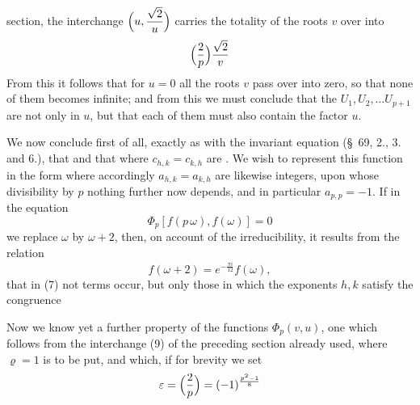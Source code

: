 section, the interchange $\Bigl(u,\dfrac{\sqrt2}{u}\Bigr)$ carries the
totality of the roots $v$ over into
\[
\Bigl(\frac{2}{p}\Bigr)\frac{\sqrt2}{v}
\]
From this it follows that for $u=0$ all the roots $v$ pass over into
zero, so that none of them becomes infinite; and from this we must
conclude that the $U_1, U_2, \ldots U_{p+1}$ are not only
 in $u$, but that each of them must also
contain the factor $u$.

We now conclude first of all, exactly as with the invariant equation
(\S\ 69, 2., 3. and 6.), that
and that
where $c_{h,k}=c_{k,h}$ are .
We wish to represent this function in the form
where accordingly $a_{h,k}=a_{k,h}$ are likewise integers, upon whose
divisibility by $p$ nothing further now depends, and in particular
$a_{p,p}=-1$. If in the equation
\[
\Phi_p[f(p\,\omega), f(\omega)]=0
\]
we replace $\omega$ by $\omega+2$, then, on account of the
irreducibility, it results from the relation
\[
f(\omega+2)=e^{-\frac{\pi i}{12}}f(\omega),
\]
that in (7) not  terms occur, but only those in which the exponents
$h, k$ satisfy the congruence

Now we know yet a further property of the functions
$\Phi_p(v,u)$, one which follows from the interchange (9) of the
preceding section already used, where $\varrho=1$ is to be put, and
which, if for brevity we set
\[
\varepsilon=\Bigl(\frac{2}{p}\Bigr)=(-1)^{\frac{p^2-1}{8}}
\]
